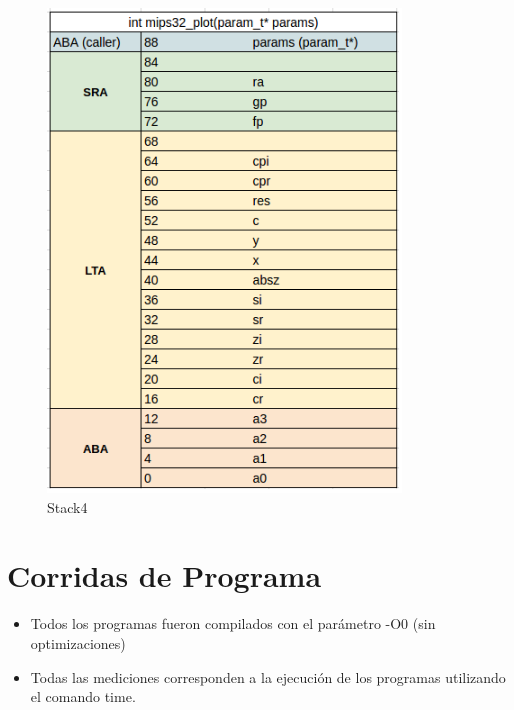 \documentclass{article}
\begin{document}
\begin{figure}[H]
	\centering
		\includegraphics[scale=0.4]{stack4.png}
	\caption{Stack4}
	\label{fig:stack4}
\end{figure}

\clearpage

\section{Corridas de Programa}
\begin{itemize}
\item Todos los programas fueron compilados con el parámetro -O0 (sin optimizaciones)
\item Todas las mediciones corresponden a la ejecución de los programas utilizando el comando time.
\end{itemize}
\end{document}
